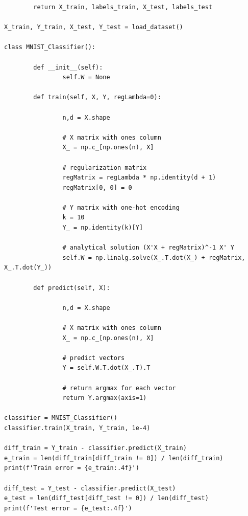 \documentclass{article}
\begin{document}
\begin{enumerate}
\begin{verbatim}
        return X_train, labels_train, X_test, labels_test

X_train, Y_train, X_test, Y_test = load_dataset()

class MNIST_Classifier():

        def __init__(self):
                self.W = None

        def train(self, X, Y, regLambda=0):
                
                n,d = X.shape
                
                # X matrix with ones column
                X_ = np.c_[np.ones(n), X]
                
                # regularization matrix
                regMatrix = regLambda * np.identity(d + 1)
                regMatrix[0, 0] = 0
                
                # Y matrix with one-hot encoding
                k = 10
                Y_ = np.identity(k)[Y]

                # analytical solution (X'X + regMatrix)^-1 X' Y
                self.W = np.linalg.solve(X_.T.dot(X_) + regMatrix, X_.T.dot(Y_))
                
        def predict(self, X):
                
                n,d = X.shape
                
                # X matrix with ones column
                X_ = np.c_[np.ones(n), X]
                
                # predict vectors
                Y = self.W.T.dot(X_.T).T
                
                # return argmax for each vector
                return Y.argmax(axis=1)

classifier = MNIST_Classifier()
classifier.train(X_train, Y_train, 1e-4)

diff_train = Y_train - classifier.predict(X_train)
e_train = len(diff_train[diff_train != 0]) / len(diff_train)
print(f'Train error = {e_train:.4f}')

diff_test = Y_test - classifier.predict(X_test)
e_test = len(diff_test[diff_test != 0]) / len(diff_test)
print(f'Test error = {e_test:.4f}')
\end{verbatim}
\end{enumerate}

\newpage
\end{document}
